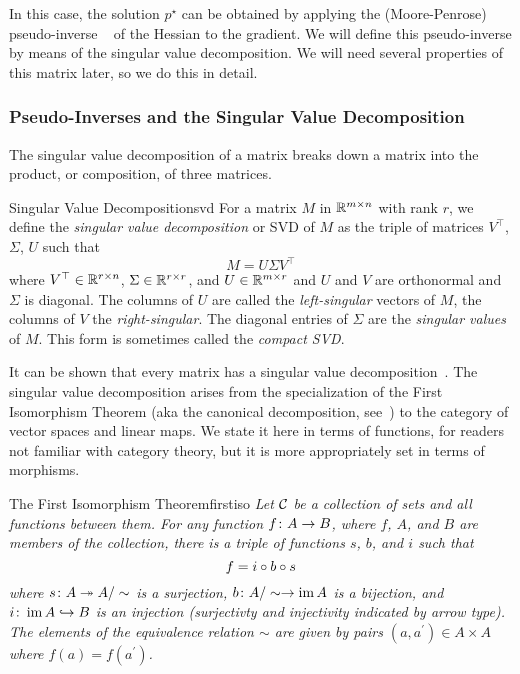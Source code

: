 \documentclass[../../thesis.tex]{subfiles}
\begin{document}
In this case, the solution $p^\star$
can be obtained by applying the
(Moore-Penrose) pseudo-inverse%
~\cite{penrose1955}
of the Hessian to the gradient.
We will define this pseudo-inverse
by means of the singular value decomposition.
We will need several properties
of this matrix later,
so we do this in detail.

\subsubsection{Pseudo-Inverses and the Singular Value Decomposition}%

The singular value decomposition of a matrix
breaks down a matrix into the product,
or composition, of three matrices.
\begin{definition}{Singular Value Decomposition}{svd}
	For a matrix $M$ in $\mathbb{R}^{m \times n}$
	with rank $r$,
	we define the
	\emph{singular value decomposition} or SVD of $M$
	as the triple of matrices $V^\top$, $\Sigma$, $U$
	such that
	\begin{equation}
		M = U \Sigma V^\top
	\end{equation}
	where $V^\top \in \mathbb{R}^{r \times n}$,
	$\Sigma \in \mathbb{R}^{r \times r}$, and
	$U \in \mathbb{R}^{m \times r}$
	and $U$ and $V$ are orthonormal
	and $\Sigma$ is diagonal.
	The columns of $U$ are called the \emph{left-singular}
	vectors of $M$, the columns of $V$ the \emph{right-singular}.
	The diagonal entries of $\Sigma$ are the \emph{singular values} of $M$.
	This form is sometimes called the \emph{compact SVD}.
\end{definition}

It can be shown that every matrix has a
singular value decomposition~\cite{strang1993}.
The singular value decomposition arises
from the specialization of the First Isomorphism Theorem
(aka the canonical decomposition,
see~\cite[Theorem 2.7]{aluffi2009})
to the category of vector spaces and linear maps.
We state it here in terms of functions,
for readers not familiar with category theory,
but it is more appropriately set in terms of morphisms.

\begin{theorem}{The First Isomorphism Theorem}{firstiso}
	\emph{Let ${\mathcal{C}}$ be a collection of sets and all functions between them.
	For any function $f\colon A \to B$, where $f$, $A$, and $B$ are members of the collection,
	there is a triple of functions $s$, $b$, and $i$ such that
	\begin{equation}
	      f = i \circ b \circ s
	\end{equation}
	where $s\colon A \twoheadrightarrow A/\sim$ is a surjection,
	$b\colon A/\sim \to \operatorname*{im} A$ is a bijection, and
	$i\colon \operatorname*{im} A \hookrightarrow B$ is an injection
	(surjectivty and injectivity indicated by arrow type).
	The elements of the equivalence relation $\sim$
	are given by pairs $(a, a^\prime) \in A \times A$
	where $f(a) = f(a^\prime)$.}
\end{theorem}
\end{document}
